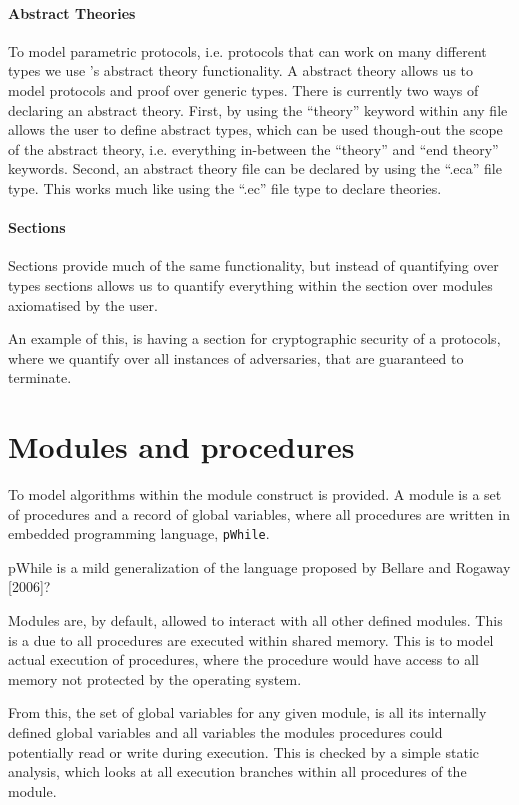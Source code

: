 \paragraph{Abstract Theories}
To model parametric protocols, i.e. protocols that can work on many different
types we use \easycrypt's abstract theory functionality. A abstract theory allows us to model
protocols and proof over generic types.
There is currently two ways of declaring an abstract theory. First, by using the
``theory'' keyword within any file allows the user to define abstract types,
which can be used though-out the scope of the abstract theory, i.e. everything
in-between the ``theory'' and ``end theory'' keywords. Second, an abstract
theory file can be declared by using the ``.eca'' file type. This works much
like using the ``.ec'' file type to declare theories.

\paragraph{Sections}
Sections provide much of the same functionality, but instead of quantifying over
types sections allows us to quantify everything within the section over modules
axiomatised by the user.

An example of this, is having a section for cryptographic security of a
protocols, where we quantify over all instances of adversaries, that are
guaranteed to terminate.


\section{Modules and procedures}
\label{sec:ec_modules}
To model algorithms within \easycrypt the module construct is provided.
A module is a set of procedures and a record of global variables, where all
procedures are written in \easycrypt embedded programming language, \texttt{pWhile}.
\begin{draft}
pWhile is a mild generalization of the language proposed by Bellare and Rogaway [2006]?
\end{draft}

Modules are, by default, allowed to interact with all other defined modules.
This is a due to all procedures are executed within shared memory. This is to
model actual execution of procedures, where the procedure would have access to
all memory not protected by the operating system.

From this, the set of global variables for any given module, is all its
internally defined global variables and all variables the modules procedures
could potentially read or write during execution. This is checked by a simple
static analysis, which looks at all execution branches within all procedures of the module.

